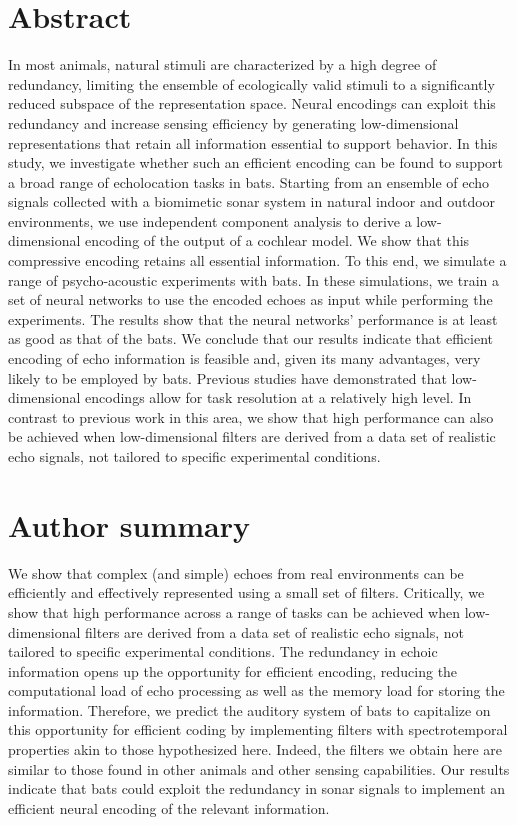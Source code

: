 \documentclass[10pt,letterpaper]{article}
\begin{document}
\section*{Abstract}
In most animals, natural stimuli are characterized by a high degree of redundancy, limiting the ensemble of ecologically valid stimuli to a significantly reduced subspace of the representation space. Neural encodings can exploit this redundancy and increase sensing efficiency by generating low-dimensional representations that retain all information essential to support behavior. In this study, we investigate whether such an efficient encoding can be found to support a broad range of echolocation tasks in bats. Starting from an ensemble of echo signals collected with a biomimetic sonar system in natural indoor and outdoor environments, we use independent component analysis to derive a low-dimensional encoding of the output of a cochlear model. We show that this compressive encoding retains all essential information. To this end, we simulate a range of psycho-acoustic experiments with bats. In these simulations, we train a set of neural networks to use the encoded echoes as input while performing the experiments. The results show that the neural networks' performance is at least as good as that of the bats. We conclude that our results indicate that efficient encoding of echo information is feasible and, given its many advantages, very likely to be employed by bats. Previous studies have demonstrated that low-dimensional encodings allow for task resolution at a relatively high level. In contrast to previous work in this area, we show that high performance can also be achieved when low-dimensional filters are derived from a data set of realistic echo signals, not tailored to specific experimental conditions.


\section*{Author summary}
We show that complex (and simple) echoes from real environments can be efficiently and effectively represented using a small set of filters. Critically, we show that high performance across a range of tasks can be achieved when low-dimensional filters are derived from a data set of realistic echo signals, not tailored to specific experimental conditions. The redundancy in echoic information opens up the opportunity for efficient encoding, reducing the computational load of echo processing as well as the memory load for storing the information. Therefore, we predict the auditory system of bats to capitalize on this opportunity for efficient coding by implementing filters with spectrotemporal properties akin to those hypothesized here. Indeed, the filters we obtain here are similar to those found in other animals and other sensing capabilities. Our results indicate that bats could exploit the redundancy in sonar signals to implement an efficient neural encoding of the relevant information.
\end{document}
